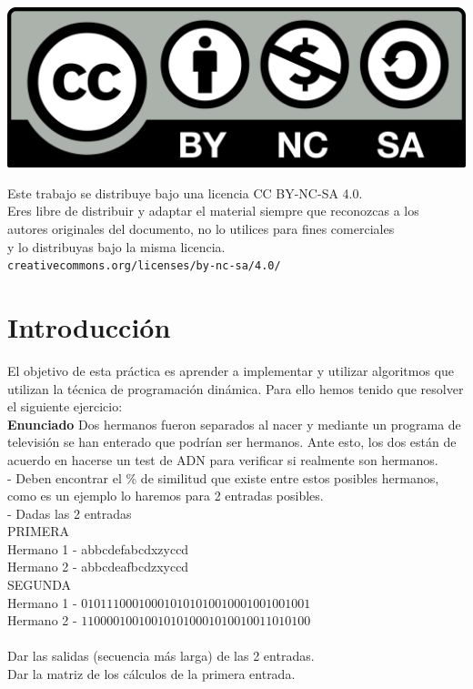 \documentclass[10pt,a4paper]{article}
\begin{document}
\parbox[t]{\textwidth}{
  \includegraphics[scale=0.05]{by-nc-sa.png}\\[4pt]
  \raggedright %
  \sffamily\large
  {\Large Este trabajo se distribuye bajo una licencia CC BY-NC-SA 4.0.}\\[4pt]
  Eres libre de distribuir y adaptar el material siempre que reconozcas a los\\
  autores originales del documento, no lo utilices para fines comerciales\\
  y lo distribuyas bajo la misma licencia.\\[4pt]
  \texttt{creativecommons.org/licenses/by-nc-sa/4.0/}
}

\newpage

\tableofcontents

\newpage

\section{Introducción}

El objetivo de esta práctica es aprender a implementar y utilizar algoritmos que utilizan la técnica de programación dinámica. Para ello hemos tenido que resolver el siguiente ejercicio:\\

\textbf{Enunciado} Dos hermanos fueron separados al nacer y mediante un programa de televisión se han enterado que podrían ser hermanos. Ante esto, los dos están de acuerdo en hacerse un test de ADN para verificar si realmente son hermanos.\\
- Deben encontrar el \% de similitud que existe entre estos posibles hermanos, como es un ejemplo lo haremos para 2 entradas posibles.\\
- Dadas las 2 entradas\\
PRIMERA \\
Hermano 1 - abbcdefabcdxzyccd \\
Hermano 2 - abbcdeafbcdzxyccd \\
SEGUNDA\\
Hermano 1 - $010111000100010101010010001001001001$\\
Hermano 2 - $110000100100101010001010010011010100$\\
\\
Dar las salidas (secuencia más larga) de las 2 entradas.\\
Dar la matriz de los cálculos de la primera entrada.
\\
\\
\end{document}

